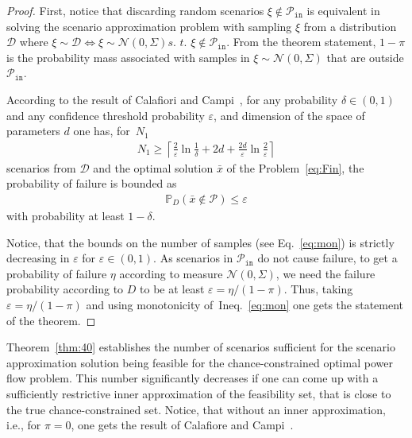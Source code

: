 \begin{proof}
First, notice that discarding random scenarios $\xi\notin \mathcal{P}_{\texttt{in}}$ is equivalent in solving the scenario approximation problem with sampling $\xi$ from a distribution $\mathcal{D}$ where  $\xi \sim \mathcal{D} \Leftrightarrow \xi\sim \mathcal{N}(0, \Sigma) \textit{s. t. } \xi\not\in \mathcal{P}_{\texttt{in}}$. From the theorem statement, $1-\pi$ is the probability mass associated with samples in $\xi\sim \mathcal{N}(0, \Sigma)$ that are outside $\mathcal{P}_{\texttt{in}}$.

According to the result of Calafiori and Campi~\cite{calafiore2006scenario}, for any probability $\delta\in (0,1)$ and any confidence threshold probability $\varepsilon$, and dimension of the space of parameters $d$ one has, for~$N_1$
\begin{align}\label{eq:mon}
  N_1 \ge \left\lceil \frac{2}{\varepsilon} \ln \frac{1}{\delta} + 2d + \frac{2d}{\varepsilon} \ln \frac{2}{\varepsilon}\right\rceil 
\end{align}
scenarios from $\mathcal{D}$ and the optimal solution 
$\bar x$ of the Problem~\eqref{eq:Fin}, 
the probability of failure is bounded as
\begin{align*}
  \mathbb{P}_D(\bar{x}\not\in \mathcal{P}) \le \varepsilon
\end{align*}
with probability at least $1-\delta$. 

Notice, that the bounds on the number of samples (see Eq.~\eqref{eq:mon}) is strictly decreasing in $\varepsilon$ for $\varepsilon \in (0,1)$. As scenarios in $\mathcal{P}_{\texttt{in}}$ do not cause failure, to get a probability of failure $\eta$ according to measure $\mathcal{N}(0, \Sigma)$, we need the failure probability according to $D$ to be at least $\varepsilon = \eta/(1-\pi)$.  
Thus, taking $\varepsilon = \eta/(1-\pi)$ and using monotonicity of~Ineq.~\eqref{eq:mon} one gets the statement of the theorem. 
\end{proof}

Theorem~\ref{thm:40} establishes the number of scenarios sufficient for the scenario approximation solution being feasible for the chance-constrained optimal power flow problem. This number significantly decreases if one can come up with a sufficiently restrictive inner approximation of the feasibility set, that is close to the true chance-constrained set. Notice, that without an inner approximation, i.e., for $\pi = 0$, one gets the result of Calafiore and Campi~\cite[Theorem 1]{calafiore2006scenario}. %

